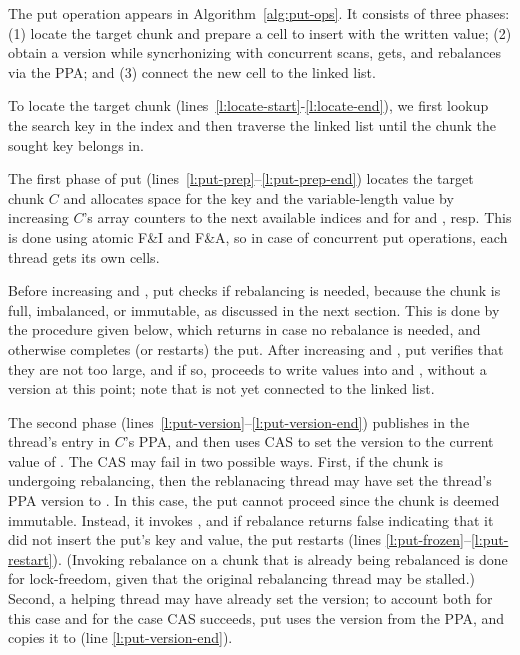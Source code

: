 The put operation appears in Algorithm~\ref{alg:put-ops}. It
consists of three phases: (1) locate the target chunk and
prepare a cell to insert with the written value; (2) obtain a version while syncrhonizing with
concurrent scans, gets, and rebalances via the PPA; and (3) connect  the new cell to the linked list.


To locate the target chunk (lines~\ref{l:locate-start}-\ref{l:locate-end}), we first lookup the search key in the index
and then traverse the linked list until the chunk the sought key belongs in.

The first phase of put (lines~\ref{l:put-prep}--\ref{l:put-prep-end})
locates the target chunk $C$ and  allocates space for the key and the variable-length value 
by increasing $C$'s array  counters to the next available indices  and  for  and , resp.
This is done using atomic F\&I and F\&A, so in case of concurrent put operations, each thread gets its own cells.

Before increasing  and , put checks if rebalancing is needed, because the chunk is full, imbalanced, or immutable, 
as discussed in the next section. This is done by the procedure  given below, 
which returns  in case no rebalance is needed, and otherwise completes (or restarts) the put.
After increasing  and , put verifies that they are not too large, 
and if so, proceeds to write values into  and , without a version at this point; note that  is not yet connected to the linked list.

The second phase (lines~\ref{l:put-version}--\ref{l:put-version-end}) publishes  in the thread's entry in $C$'s PPA,
and then uses CAS to set the version to the current value of .
The CAS may fail in two possible ways. First, if the chunk is undergoing rebalancing, then
the reblanacing thread may have set the thread's PPA version to .
In this case, the put cannot proceed since the chunk is deemed immutable. Instead, it invokes , 
and if rebalance returns false indicating that it did not insert the put's key and value, the put restarts
(lines \ref{l:put-frozen}--\ref{l:put-restart}).
(Invoking rebalance on a chunk that is already being rebalanced is done for lock-freedom, given that the original rebalancing thread
may be stalled.)
Second, a helping thread may have already set the version;
to account both for this case and for the case CAS succeeds,
put uses the version from the PPA, and copies it to  (line \ref{l:put-version-end}).

